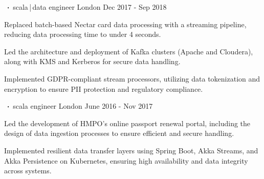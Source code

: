 \begin{cventries}
    \cventry
    {      }
    {$\sqbig$scala\,|\,data engineer}
    {London}
    {Dec 2017 - Sep 2018}
    {}
    {
        \begin{cvitems}
            \item{Replaced batch-based Nectar card data processing with a streaming pipeline, reducing data processing time to under 4 seconds.}
            \item{Led the architecture and deployment of Kafka clusters (Apache and Cloudera), along with KMS and Kerberos for secure data handling.}
            \item{Implemented GDPR-compliant stream processors, utilizing data tokenization and encryption to ensure PII protection and regulatory compliance.}
        \end{cvitems}
    }

    \cventry
    {      }
    {$\sqbig$scala engineer}
    {London}
    {June 2016 - Nov 2017}
    {}
    {
        \begin{cvitems}
            \item{Led the development of HMPO’s online passport renewal portal, including the design of data ingestion processes to ensure efficient and secure handling.}
            \item{Implemented resilient data transfer layers using Spring Boot, Akka Streams, and Akka Persistence on Kubernetes, ensuring high availability and data integrity across systems.}
        \end{cvitems}
    }


\end{cventries}
